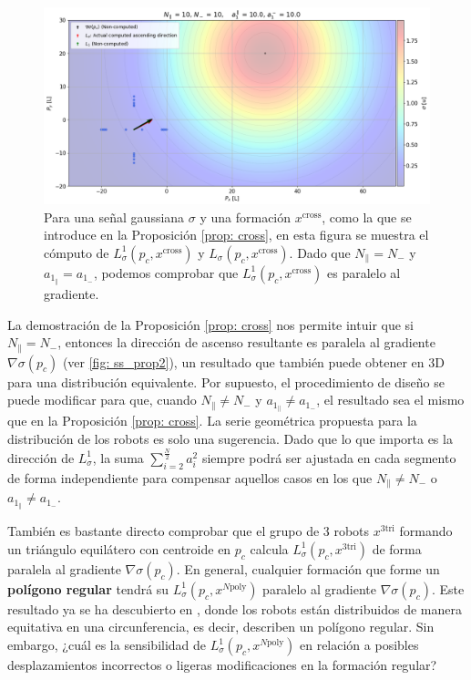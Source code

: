 \begin{figure}[!h]
\centering
\includegraphics[trim={0 0 0 0}, clip, width=1\columnwidth]{./fig/ss_prop2.png}
\caption{Para una señal gaussiana $\sigma$ y una formación $x^{\text{cross}}$, como la que se introduce en la Proposición \ref{prop: cross}, en esta figura se muestra el cómputo de $L^1_\sigma(p_c, x^{\text{cross}})$ y $L_\sigma(p_c, x^{\text{cross}})$. Dado que $N_\parallel = N_-$ y $a_{1_\parallel} = a_{1_-}$, podemos comprobar que $L^1_\sigma(p_c, x^{\text{cross}})$ es paralelo al gradiente.}
\label{fig: ss_prop2}
\end{figure}  

\newpage

La demostración de la Proposición \ref{prop: cross} nos permite intuir que si $N_\parallel = N_-$, entonces la dirección de ascenso resultante es paralela al gradiente $\nabla\sigma(p_c)$ (ver \autoref{fig: ss_prop2}), un resultado que también puede obtener en 3D para una distribución equivalente. Por supuesto, el procedimiento de diseño se puede modificar para que, cuando $N_\parallel \neq N_-$ y $a_{1_\parallel} \neq a_{1_-}$, el resultado sea el mismo que en la Proposición \ref{prop: cross}. La serie geométrica propuesta para la distribución de los robots es solo una sugerencia. Dado que lo que importa es la dirección de $L_\sigma^1$, la suma $\sum_{i=2}^{\frac{N}{2}}a_i^2$ siempre podrá ser ajustada en cada segmento de forma independiente para compensar aquellos casos en los que $N_\parallel \neq N_-$ o $a_{1_\parallel} \neq a_{1_-}$.

También es bastante directo comprobar que el grupo de 3 robots $x^{3\text{tri}}$ formando un triángulo equilátero con centroide en $p_c$ calcula $L^1_\sigma(p_c, x^{3\text{tri}})$ de forma paralela al gradiente $\nabla\sigma(p_c)$. En general, cualquier formación que forme un \textbf{polígono regular} tendrá su $L^1_\sigma(p_c, x^{N\text{poly}})$ paralelo al gradiente $\nabla\sigma(p_c)$. Este resultado ya se ha descubierto en \cite{brinon2015distributed}, donde los robots están distribuidos de manera equitativa en una circunferencia, es decir, describen un polígono regular. Sin embargo, ¿cuál es la sensibilidad de $L^1_\sigma(p_c, x^{N\text{poly}})$ en relación a posibles desplazamientos incorrectos o ligeras modificaciones en la formación regular? 


